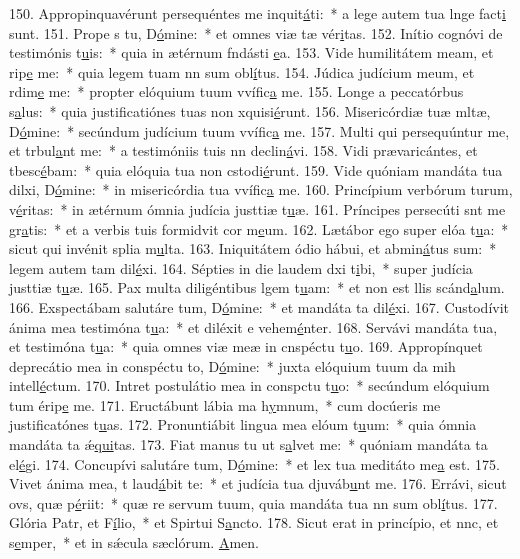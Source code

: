 150. Appropinquavérunt persequéntes me inquit\uline{á}ti:~* a lege autem tua lnge fact\uline{i} sunt.
151. Prope s tu, D\uline{ó}mine:~* et omnes viæ tæ vér\uline{i}tas.
152. Inítio cognóvi de testimónis t\uline{u}is:~* quia in ætérnum fndásti \uline{e}a.
153. Vide humilitátem meam, et rip\uline{e} me:~* quia legem tuam nn sum obl\uline{í}tus.
154. Júdica judícium meum, et rdim\uline{e} me:~* propter elóquium tuum vvífic\uline{a} me.
155. Longe a peccatórbus s\uline{a}lus:~* quia justificatiónes tuas non xquisi\uline{é}runt.
156. Misericórdiæ tuæ mltæ, D\uline{ó}mine:~* secúndum judícium tuum vvífic\uline{a} me.
157. Multi qui persequúntur me, et trbul\uline{a}nt me:~* a testimóniis tuis nn declin\uline{á}vi.
158. Vidi prævaricántes, et tbesc\uline{é}bam:~* quia elóquia tua non cstodi\uline{é}runt.
159. Vide quóniam mandáta tua dilxi, D\uline{ó}mine:~* in misericórdia tua vvífic\uline{a} me.
160. Princípium verbórum turum, v\uline{é}ritas:~* in ætérnum ómnia judícia justtiæ t\uline{u}æ.
161. Príncipes persecúti snt me gr\uline{a}tis:~* et a verbis tuis formidvit cor m\uline{e}um.
162. Lætábor ego super elóa t\uline{u}a:~* sicut qui invénit splia m\uline{u}lta.
163. Iniquitátem ódio hábui, et abmin\uline{á}tus sum:~* legem autem tam dil\uline{é}xi.
164. Sépties in die laudem dxi t\uline{i}bi,~* super judícia justtiæ t\uline{u}æ.
165. Pax multa diligéntibus lgem t\uline{u}am:~* et non est llis scánd\uline{a}lum.
166. Exspectábam salutáre tum, D\uline{ó}mine:~* et mandáta ta dil\uline{é}xi.
167. Custodívit ánima mea testimóna t\uline{u}a:~* et diléxit e vehem\uline{é}nter.
168. Servávi mandáta tua, et testimóna t\uline{u}a:~* quia omnes viæ meæ in cnspéctu t\uline{u}o.
169. Appropínquet deprecátio mea in conspéctu to, D\uline{ó}mine:~* juxta elóquium tuum da mih intell\uline{é}ctum.
170. Intret postulátio mea in conspctu t\uline{u}o:~* secúndum elóquium tum érip\uline{e} me.
171. Eructábunt lábia ma h\uline{y}mnum,~* cum docúeris me justificatónes t\uline{u}as.
172. Pronuntiábit lingua mea elóum t\uline{u}um:~* quia ómnia mandáta ta ǽ\uline{qui}tas.
173. Fiat manus tu ut s\uline{a}lvet me:~* quóniam mandáta ta el\uline{é}gi.
174. Concupívi salutáre tum, D\uline{ó}mine:~* et lex tua meditáto me\uline{a} est.
175. Vivet ánima mea, t laud\uline{á}bit te:~* et judícia tua djuváb\uline{u}nt me.
176. Errávi, sicut ovs, quæ p\uline{é}riit:~* quæ re servum tuum, quia mandáta tua nn sum obl\uline{í}tus.
177. Glória Patr, et F\uline{í}lio,~* et Spirtui S\uline{a}ncto.
178. Sicut erat in princípio, et nnc, et s\uline{e}mper,~* et in sǽcula sæclórum. \uline{A}men.
